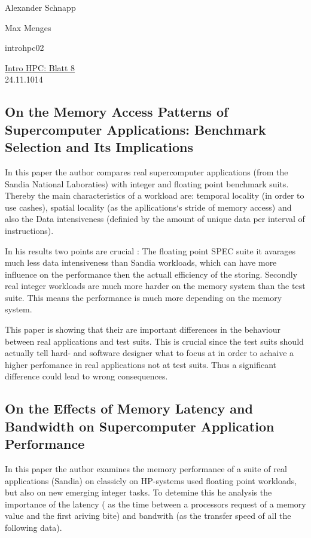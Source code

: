 \documentclass[a4paper,11pt]{scrartcl}
\begin{document}
\hfill Alexander Schnapp

\hfill Max Menges

\hfill introhpc02

\begin{center}
\underline{\Huge{Intro HPC: Blatt 8}}\\
\large{24.11.1014}\\
\end{center}


\subsection{On the Memory Access Patterns of Supercomputer Applications: Benchmark Selection and Its Implications}
In this paper the author compares real supercomputer applications (from the Sandia National Laboraties) with integer and floating point benchmark suits. Thereby the main characteristics of a workload are: temporal locality (in order to use cashes), spatial locality (as the apllications`s stride of memory access) and also the Data intensiveness (definied by the amount of unique data per interval of instructions).

In his results two points are crucial : The floating point SPEC suite it avarages much less data intensiveness than Sandia workloads, which can have more influence on the performance then the actuall efficiency of the storing. Secondly real integer workloads are much more harder on the memory system than the test suite. This means the performance is much more depending on the memory system.

This paper is showing that their are important differences in the behaviour between real applications and test suits. This is crucial since the test suits should actually tell hard- and software designer what to focus at in order to achaive a higher perfomance in real applications not at test suits. Thus a significant difference could lead to wrong consequences.


 \subsection{On the Effects of Memory Latency and Bandwidth on Supercomputer Application Performance}
In this paper the author examines the memory performance of a suite of real applications (Sandia) on classicly on HP-systems used floating point workloads, but also on new emerging integer tasks. To detemine this he analysis the importance of the latency ( as the time between a processors request of a memory value and the first ariving bite) and
bandwith (as the transfer speed of all the following data). 
\end{document}
